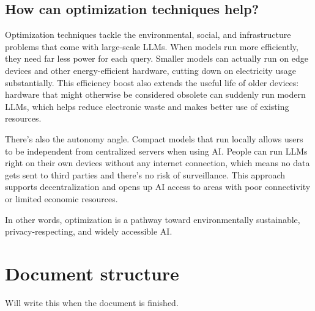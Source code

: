 \subsection{How can optimization techniques help?}
Optimization techniques tackle the environmental, social, and infrastructure problems that come with large-scale LLMs. When models run more efficiently, they need far less power for each query. Smaller models can actually run on edge devices and other energy-efficient hardware, cutting down on electricity usage substantially. This efficiency boost also extends the useful life of older devices: hardware that might otherwise be considered obsolete can suddenly run modern LLMs, which helps reduce electronic waste and makes better use of existing resources.

There's also the autonomy angle. Compact models that run locally allows users to be independent from centralized servers when using AI. People can run LLMs right on their own devices without any internet connection, which means no data gets sent to third parties and there's no risk of surveillance. This approach supports decentralization and opens up AI access to areas with poor connectivity or limited economic resources.

In other words, optimization is a pathway toward environmentally sustainable, privacy-respecting, and widely accessible AI.


\section{Document structure}
Will write this when the document is finished.